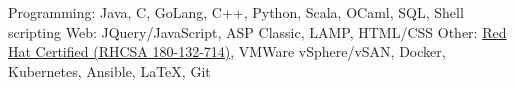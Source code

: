 \begin{cvskills}
    \cvskill
    {Programming:}
    {Java, C, GoLang, C++, Python, Scala, OCaml, SQL, Shell scripting}
	\cvskill
	{Web:}
	{JQuery/JavaScript, ASP Classic, LAMP, HTML/CSS}
	\cvskill
	{Other:}
    {\href{https://www.redhat.com/rhtapps/services/verify/?certId=180-132-714}{Red Hat Certified (RHCSA 180-132-714)}, VMWare vSphere/vSAN, Docker, Kubernetes, Ansible, LaTeX, Git}
	\vspace{-1.5em} %
\end{cvskills}
